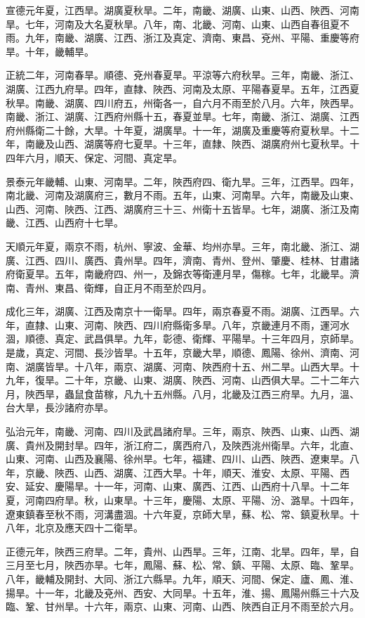 \begin{pinyinscope}
宣德元年夏，江西旱。湖廣夏秋旱。二年，南畿、湖廣、山東、山西、陜西、河南旱。七年，河南及大名夏秋旱。八年，南、北畿、河南、山東、山西自春徂夏不雨。九年，南畿、湖廣、江西、浙江及真定、濟南、東昌、兗州、平陽、重慶等府旱。十年，畿輔旱。

正統二年，河南春旱。順德、兗州春夏旱。平涼等六府秋旱。三年，南畿、浙江、湖廣、江西九府旱。四年，直隸、陜西、河南及太原、平陽春夏旱。五年，江西夏秋旱。南畿、湖廣、四川府五，州衛各一，自六月不雨至於八月。六年，陜西旱。南畿、浙江、湖廣、江西府州縣十五，春夏並旱。七年，南畿、浙江、湖廣、江西府州縣衛二十餘，大旱。十年夏，湖廣旱。十一年，湖廣及重慶等府夏秋旱。十二年，南畿及山西、湖廣等府七夏旱。十三年，直隸、陜西、湖廣府州七夏秋旱。十四年六月，順天、保定、河間、真定旱。

景泰元年畿輔、山東、河南旱。二年，陜西府四、衛九旱。三年，江西旱。四年，南北畿、河南及湖廣府三，數月不雨。五年，山東、河南旱。六年，南畿及山東、山西、河南、陜西、江西、湖廣府三十三、州衛十五皆旱。七年，湖廣、浙江及南畿、江西、山西府十七旱。

天順元年夏，兩京不雨，杭州、寧波、金華、均州亦旱。三年，南北畿、浙江、湖廣、江西、四川、廣西、貴州旱。四年，濟南、青州、登州、肇慶、桂林、甘肅諸府衛夏旱。五年，南畿府四、州一，及錦衣等衛連月旱，傷稼。七年，北畿旱。濟南、青州、東昌、衛輝，自正月不雨至於四月。

成化三年，湖廣、江西及南京十一衛旱。四年，兩京春夏不雨。湖廣、江西旱。六年，直隸、山東、河南、陜西、四川府縣衛多旱。八年，京畿連月不雨，運河水涸，順德、真定、武昌俱旱。九年，彰德、衛輝、平陽旱。十三年四月，京師旱。是歲，真定、河間、長沙皆旱。十五年，京畿大旱，順德、鳳陽、徐州、濟南、河南、湖廣皆旱。十八年，兩京、湖廣、河南、陜西府十五、州二旱。山西大旱。十九年，復旱。二十年，京畿、山東、湖廣、陜西、河南、山西俱大旱。二十二年六月，陜西旱，蟲鼠食苗稼，凡九十五州縣。八月，北畿及江西三府旱。九月，溫、台大旱，長沙諸府亦旱。

弘治元年，南畿、河南、四川及武昌諸府旱。三年，兩京、陜西、山東、山西、湖廣、貴州及開封旱。四年，浙江府二，廣西府八，及陜西洮州衛旱。六年，北直、山東、河南、山西及襄陽、徐州旱。七年，福建、四川、山西、陜西、遼東旱。八年，京畿、陜西、山西、湖廣、江西大旱。十年，順天、淮安、太原、平陽、西安、延安、慶陽旱。十一年，河南、山東、廣西、江西、山西府十八旱。十二年夏，河南四府旱。秋，山東旱。十三年，慶陽、太原、平陽、汾、潞旱。十四年，遼東鎮春至秋不雨，河溝盡涸。十六年夏，京師大旱，蘇、松、常、鎮夏秋旱。十八年，北京及應天四十二衛旱。

正德元年，陜西三府旱。二年，貴州、山西旱。三年，江南、北旱。四年，旱，自三月至七月，陜西亦旱。七年，鳳陽、蘇、松、常、鎮、平陽、太原、臨、鞏旱。八年，畿輔及開封、大同、浙江六縣旱。九年，順天、河間、保定、廬、鳳、淮、揚旱。十一年，北畿及兗州、西安、大同旱。十五年，淮、揚、鳳陽州縣三十六及臨、鞏、甘州旱。十六年，兩京、山東、河南、山西、陜西自正月不雨至於六月。


\end{pinyinscope}
